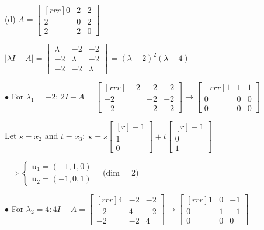 \documentclass{article}
\begin{document}
    \begin{minipage}[t]{0.48\linewidth}
        (d) $A = \begin{bmatrix}[rrr]
            0 & 2 & 2 \\
            2 & 0 & 2 \\
            2 & 2 & 0 
        \end{bmatrix} $

        $| \lambda I - A| = \begin{vmatrix}
            \lambda  & -2 & -2 \\
            -2 & \lambda  & -2 \\
            -2 & -2 & \lambda  
        \end{vmatrix} = ( \lambda  + 2 )^2( \lambda  - 4 )$

        $\bullet$ For $ \lambda _1 = -2$: $2I - A = \begin{bmatrix}[rrr]
            -2 & -2 & -2 \\
            -2 & -2 & -2 \\
            -2 & -2 & -2
        \end{bmatrix} \to \begin{bmatrix}[rrr]
            1 & 1 & 1 \\
            0 & 0 & 0 \\
            0 & 0 & 0
        \end{bmatrix}  $

        Let $s = x_2$ and $t = x_3$: $ \textbf{x} = s \begin{bmatrix}[r]
            -1 \\
            1 \\ 0 
        \end{bmatrix} + t \begin{bmatrix}[r]
            -1 \\
            0 \\
            1 
        \end{bmatrix} $

        $\implies \begin{cases}{}
            \textbf{u}_1 = (-1, 1, 0) \\
            \textbf{u}_2 = (-1, 0, 1)
        \end{cases} \quad \text{(dim = 2)}$


    $\bullet$ For $ \lambda _2 = 4: 4I - A = \begin{bmatrix}[rrr]
        4 & -2 & -2 \\
        -2 & 4 & -2 \\
        -2 & -2 & 4 
    \end{bmatrix} \to \begin{bmatrix}[rrr]
        1 & 0 & -1 \\
        0 & 1 & -1 \\
        0 & 0 & 0 
    \end{bmatrix} $


\end{minipage}
\end{document}
